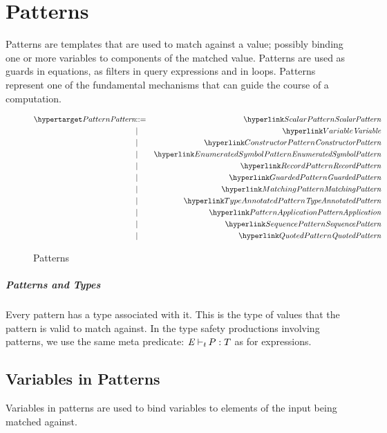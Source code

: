 \chapter{Patterns}
\label{patterns}
Patterns are templates that are used to match against a value; possibly binding one or more variables to components of the matched value. Patterns are used as guards in equations, as filters in query expressions and in  loops. Patterns represent one of the fundamental mechanisms that can guide the course of a computation.

\begin{figure}[htbp]
\begin{eqnarray*}
\ntDef{Pattern}&\arrow&\ntRef{ScalarPattern}\\
&\choice&\ntRef{Variable}\\
&\choice&\ntRef{ConstructorPattern}\\
&\choice&\ntRef{EnumeratedSymbolPattern}\\
&\choice&\ntRef{RecordPattern}\\
&\choice&\ntRef{GuardedPattern}\\
&\choice&\ntRef{MatchingPattern}\\
&\choice&\ntRef{TypeAnnotatedPattern}\\
&\choice&\ntRef{PatternApplication}\\
&\choice&\ntRef{SequencePattern}\\
&\choice&\ntRef{QuotedPattern}
\end{eqnarray*}
\caption{Patterns}
\label{patternsFig}
\end{figure}

\paragraph{Patterns and Types}
\label{patternType}
Every pattern has a type associated with it. This is the type of values that the pattern is valid to match against. In the type safety productions involving patterns, we use the same meta predicate: $\emph{E}~\mbox{$\vdash_{t}$}{}\,P:T$ as for expressions.

\section{Variables in Patterns}
\label{patternVariables}
Variables in patterns are used to bind variables to elements of the input being matched against.

